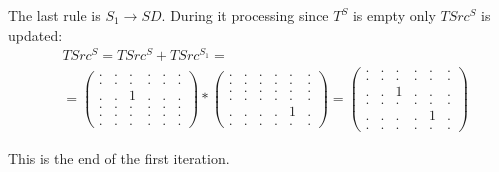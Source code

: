The last rule is $S_1 \to S D$.
During it processing since $T^S$ is empty only $TSrc^S$ is updated: 
{
    \renewcommand{\arraystretch}{0.7}
    \setlength\arraycolsep{2pt}
\begin{align*}
&TSrc^S = TSrc^S + TSrc^{S_1} = \\ &=
\begin{pmatrix}
    . & . & . & . & . & . \\
    . & . & . & . & . & . \\
    . & . & 1 & . & . & . \\
    . & . & . & . & . & . \\ 
    . & . & . & . & . & . \\ 
    . & . & . & . & . & .
\end{pmatrix}*
\begin{pmatrix}
    . & . & . & . & . & . \\
    . & . & . & . & . & . \\
    . & . & . & . & . & . \\
    . & . & . & . & . & . \\ 
    . & . & . & . & 1 & . \\ 
    . & . & . & . & . & .
\end{pmatrix}= 
\begin{pmatrix}
    . & . & . & . & . & . \\
    . & . & . & . & . & . \\
    . & . & 1 & . & . & . \\
    . & . & . & . & . & . \\ 
    . & . & . & . & 1 & . \\ 
    . & . & . & . & . & .
\end{pmatrix}
\end{align*}
}

This is the end of the first iteration.

